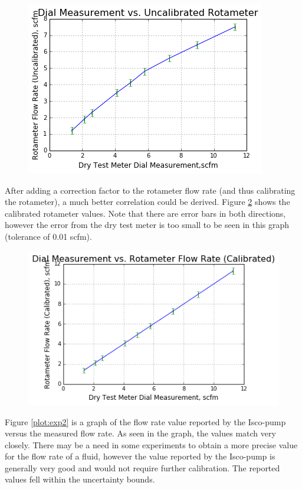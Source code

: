 \documentclass[paper=letter, fontsize=10pt]{scrartcl} %
\begin{document}
\begin{figure}[!h]
  \includegraphics[scale=0.6]{Lab1FigureUncalRot} 
  \centering
  \label{plot:exp1A}
\end{figure}

After adding a correction factor to the rotameter flow rate (and thus calibrating the rotameter), a much better correlation could be derived.  Figure \ref{plot:exp1B} shows the calibrated rotameter values.  Note that there are error bars in both directions, however the error from the dry test meter is too small to be seen in this graph (tolerance of 0.01 scfm).

\begin{figure}[!h]
  \label{plot:exp1B}
  \includegraphics[scale=0.6]{Lab1FigureRot} 
  \centering
\end{figure}

Figure \ref{plot:exp2} is a graph of the flow rate value reported by the Isco-pump versus the measured flow rate.  As seen in the graph, the values match very closely.  There may be a need in some experiments to obtain a more precise value for the flow rate of a fluid, however the value reported by the Isco-pump is generally very good and would not require further calibration.  The reported values fell within the uncertainty bounds.
\end{document}
